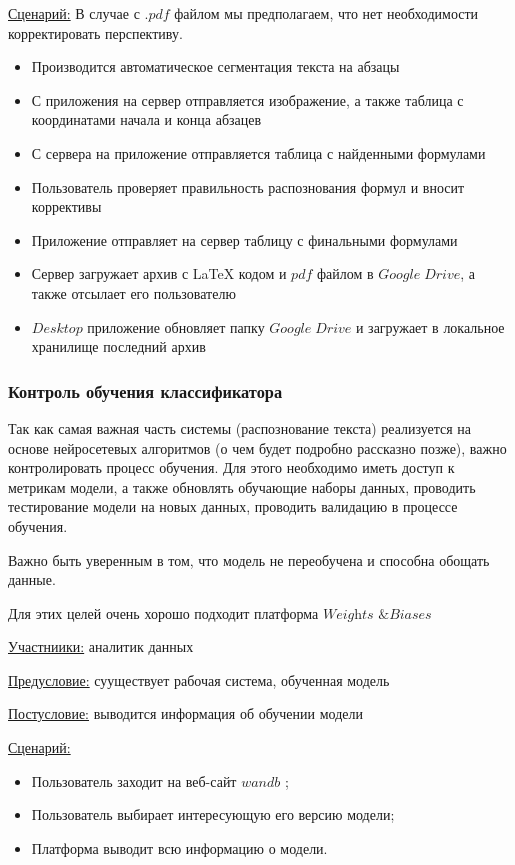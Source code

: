 \underline{Сценарий:}
В случае с $.pdf$ файлом мы предполагаем, что нет необходимости корректировать перспективу.
\begin{itemize}
    \item Производится автоматическое сегментация текста на абзацы
    \item С приложения на сервер отправляется изображение, а также таблица с координатами начала и конца абзацев
    \item С сервера на приложение отправляется таблица с найденными формулами
    \item Пользователь проверяет правильность распознования формул и вносит коррективы
    \item Приложение отправляет на сервер таблицу с финальными формулами
    \item Сервер загружает архив с \LaTeX\; кодом и $pdf$ файлом в $Google\;Drive$, а также отсылает его пользователю
    \item $Desktop$ приложение обновляет папку $Google\;Drive$ и загружает в локальное хранилище последний архив
\end{itemize}

\subsubsection{Контроль обучения классификатора}

Так как самая важная часть системы (распознование текста) реализуется на основе нейросетевых алгоритмов (о чем будет подробно рассказно позже), важно контролировать процесс обучения.
Для этого необходимо иметь доступ к метрикам модели, а также обновлять обучающие наборы данных, проводить тестирование модели на новых данных, проводить валидацию в процессе обучения.

Важно быть уверенным в том, что модель не переобучена и способна обощать данные.

Для этих целей очень хорошо подходит платформа $\textit{Weights \& Biases}$ \cite{wandb}

\underline{Участниики:} аналитик данных

\underline{Предусловие:} сууществует рабочая система, обученная модель

\underline{Постусловие:} выводится информация об обучении модели

\underline{Сценарий:}

\begin{itemize}
    \item Пользователь заходит на веб-сайт $wandb$ \cite{wandb};
    \item Пользователь выбирает интересующую его версию модели; 
    \item Платформа выводит всю информацию о модели.
\end{itemize}


